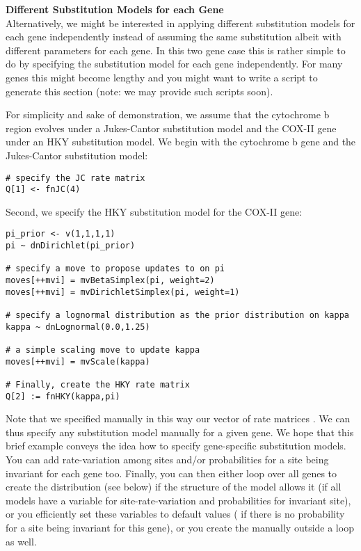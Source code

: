 \begin{framed}
\textbf{Different Substitution Models for each Gene}\\
Alternatively, we might be interested in applying different substitution models for each gene independently instead of assuming the same substitution albeit with different parameters for each gene.
In this two gene case this is rather simple to do by specifying the substitution model for each gene independently.
For many genes this might become lengthy and you might want to write a script to generate this section (note: we may provide such scripts soon).

For simplicity and sake of demonstration, we assume that the cytochrome b region evolves under a Jukes-Cantor substitution model and the COX-II gene under an HKY substitution model.
We begin with the cytochrome b gene and the Jukes-Cantor substitution model:
{\tt \small \begin{snugshade*}
\begin{lstlisting}
# specify the JC rate matrix
Q[1] <- fnJC(4)
\end{lstlisting}
\end{snugshade*}}

Second, we specify the HKY substitution model for the COX-II gene:
{\tt \begin{snugshade*}
\begin{lstlisting}
pi_prior <- v(1,1,1,1) 
pi ~ dnDirichlet(pi_prior)

# specify a move to propose updates to on pi
moves[++mvi] = mvBetaSimplex(pi, weight=2)
moves[++mvi] = mvDirichletSimplex(pi, weight=1)

# specify a lognormal distribution as the prior distribution on kappa
kappa ~ dnLognormal(0.0,1.25)

# a simple scaling move to update kappa
moves[++mvi] = mvScale(kappa)

# Finally, create the HKY rate matrix
Q[2] := fnHKY(kappa,pi)
\end{lstlisting}
\end{snugshade*}}
Note that we specified manually in this way our vector of rate matrices .
We can thus specify any substitution model manually for a given gene.
We hope that this brief example conveys the idea how to specify gene-specific substitution models.
You can add rate-variation among sites and/or probabilities for a site being invariant for each gene too.
Finally, you can then either loop over all genes to create the  distribution (see below) if the structure of the model allows it (\IE if all models have a variable for site-rate-variation and probabilities for invariant site), or you efficiently set these variables to default values (\EG {} if there is no probability for a site being invariant for this gene), or you create the  manually outside a loop as well. 
\end{framed}


